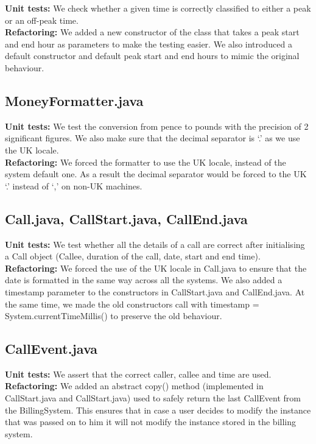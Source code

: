 \documentclass[a4paper]{article}
\begin{document}
{\bf Unit tests:} We check whether a given time is correctly classified to either a peak or an off-peak time.
\\{\bf Refactoring:} We added a new constructor of the class that takes a peak start and end hour as parameters to make the testing easier. We also introduced a default constructor and default peak start and end hours to mimic the original behaviour.

\subsection{MoneyFormatter.java}
{\bf Unit tests:} We test the conversion from pence to pounds with the precision of 2 significant figures. We also make sure that the decimal separator is ‘.’ as we use the UK locale.
\\{\bf Refactoring:} We forced the formatter to use the UK locale, instead of the system default one. As a result the decimal separator would be forced to the UK ‘.’ instead of ‘,’ on non-UK machines.

\subsection{Call.java, CallStart.java, CallEnd.java}
{\bf Unit tests:} We test whether all the details of a call are correct after initialising a Call object (Callee, duration of the call, date, start and end time).
\\{\bf Refactoring:} We forced the use of the UK locale in Call.java to ensure that the date is formatted in the same way across all the systems. We also added a timestamp parameter to the constructors in CallStart.java and CallEnd.java. At the same time, we made the old constructors call with timestamp = System.currentTimeMillis() to preserve the old behaviour.

\subsection{CallEvent.java}
{\bf Unit tests:} We assert that the correct caller, callee and time are used.
\\{\bf Refactoring:} We added an abstract copy() method (implemented in CallStart.java and CallStart.java) used to safely return the last CallEvent from the BillingSystem. This ensures that in case a user decides to modify the instance that was passed on to him it will not modify the instance stored in the billing system.
\end{document}
